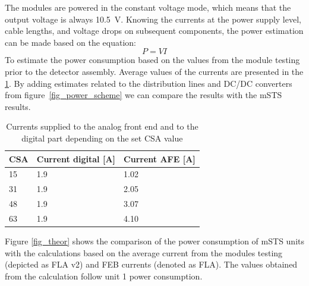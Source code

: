 The modules are powered in the constant voltage mode, which means that the output voltage is always 10.5~V. Knowing the currents at the power supply level, cable lengths, and voltage drops on subsequent components, the power estimation can be made based on the equation:
\begin{equation}
    P = VI
\end{equation}
To estimate the power consumption based on the values from the module testing prior to the detector assembly. Average values of the currents are presented in the \ref{tab:typical_cons}. By adding estimates related to the distribution lines and DC/DC converters from figure~\ref{fig_power_scheme} we can compare the results with the \gls{mSTS} results. 
\begin{table}[!h]
\centering
\begin{tabular}{lll}
\hline
CSA & Current digital {[}A{]} & Current \gls{AFE} {[}A{]} \\ \hline
15  & 1.9                 & 1.02                    \\
31  & 1.9                 & 2.05                    \\
48  & 1.9                 & 3.07                    \\
63  & 1.9                 & 4.10                    \\ \hline
\end{tabular}
\caption{Currents supplied to the analog front end and to the digital part depending on the set \gls{CSA} value}
\label{tab:typical_cons}
\end{table}
\newpage
Figure \ref{fig_theor} shows the comparison of the power consumption of \gls{mSTS} units with the calculations based on the average current from the modules testing (depicted as FLA v2) and FEB currents (denoted as FLA). The values obtained from the calculation follow unit 1 power consumption. 

